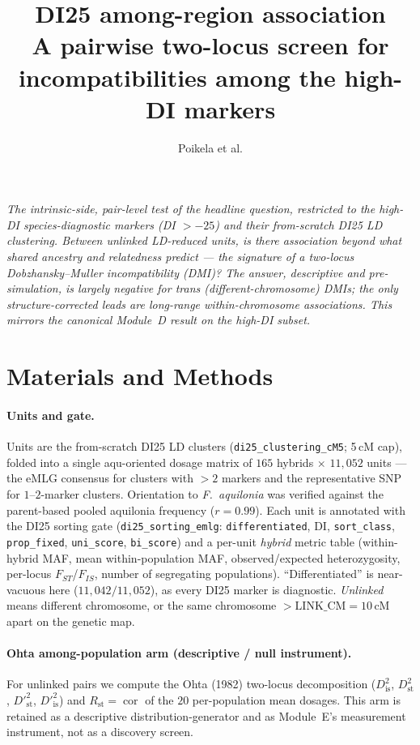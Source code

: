 \documentclass[11pt]{article}
\title{\vspace{-3em}\textbf{\color{Accent}DI25 among-region association}\\[0.3em]
  \Large A pairwise two-locus screen for incompatibilities among the high-DI markers}
\author{Poikela et al.}
\date{}
\newcommand{\Faq}{\textit{F.~aquilonia}}
\newcommand{\Rst}{\ensuremath{R_{\mathrm{st}}}}
\newcommand{\Dst}{\ensuremath{D^{2}_{\mathrm{st}}}}
\newcommand{\Dis}{\ensuremath{D^{2}_{\mathrm{is}}}}
\newcommand{\Dpst}{\ensuremath{D'^{2}_{\mathrm{st}}}}
\begin{document}
\maketitle
\vspace{-1.8em}

\noindent\textit{\small The intrinsic-side, pair-level test of the headline question, restricted to the
high-DI species-diagnostic markers (DI $>-25$) and their from-scratch DI25 LD clustering. Between
\emph{unlinked} LD-reduced units, is there association beyond what shared ancestry and relatedness
predict --- the signature of a two-locus Dobzhansky--Muller incompatibility (DMI)? The answer,
descriptive and pre-simulation, is largely negative for \emph{trans} (different-chromosome) DMIs; the
only structure-corrected leads are long-range \emph{within}-chromosome associations. This mirrors the
canonical Module~D result on the high-DI subset.}

\section{Materials and Methods}

\paragraph{Units and gate.}
Units are the from-scratch DI25 LD clusters (\texttt{di25\_clustering\_cM5}; 5\,cM cap), folded into a
single aqu-oriented dosage matrix of $165$ hybrids $\times$ $11{,}052$ units --- the eMLG consensus for
clusters with $>2$ markers and the representative SNP for $1$--$2$-marker clusters. Orientation to \Faq{}
was verified against the parent-based pooled aquilonia frequency ($r=0.99$). Each unit is annotated with
the DI25 sorting gate (\texttt{di25\_sorting\_emlg}: \texttt{differentiated}, DI, \texttt{sort\_class},
\texttt{prop\_fixed}, \texttt{uni\_score}, \texttt{bi\_score}) and a per-unit \emph{hybrid} metric table
(within-hybrid MAF, mean within-population MAF, observed/expected heterozygosity, per-locus $F_{ST}$/$F_{IS}$,
number of segregating populations). ``Differentiated'' is near-vacuous here ($11{,}042/11{,}052$), as every
DI25 marker is diagnostic. \emph{Unlinked} means different chromosome, or the same chromosome $>\text{LINK\_CM}=10$\,cM
apart on the genetic map.

\paragraph{Ohta among-population arm (descriptive / null instrument).}
For unlinked pairs we compute the Ohta (1982) two-locus decomposition (\Dis, \Dst, \Dpst, $D'^2_{\mathrm{is}}$)
and $\Rst = \operatorname{cor}$ of the $20$ per-population mean dosages. This arm is retained as a descriptive
distribution-generator and as Module~E's measurement instrument, not as a discovery screen.
\end{document}
